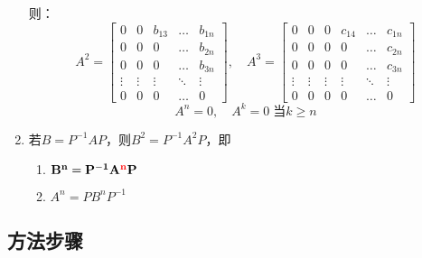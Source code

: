 \documentclass[a4paper,12pt]{article}
\begin{document}
\begin{enumerate}
        则：
        \[
            A^2 =
            \begin{bmatrix}
                0      & 0      & b_{13} & \dots  & b_{1n} \\
                0      & 0      & 0      & \dots  & b_{2n} \\
                0      & 0      & 0      & \dots  & b_{3n} \\
                \vdots & \vdots & \vdots & \ddots & \vdots \\
                0      & 0      & 0      & \dots  & 0
            \end{bmatrix}, \quad
            A^3 =
            \begin{bmatrix}
                0      & 0      & 0      & c_{14} & \dots  & c_{1n} \\
                0      & 0      & 0      & 0      & \dots  & c_{2n} \\
                0      & 0      & 0      & 0      & \dots  & c_{3n} \\
                \vdots & \vdots & \vdots & \vdots & \ddots & \vdots \\
                0      & 0      & 0      & 0      & \dots  & 0
            \end{bmatrix}
        \]
        \[
            A^n = 0, \quad A^k = 0 \; \text{当} k \ge n
        \]
        \item 若$B = P^{-1}AP$，则$B^2 = P^{-1}A^{2}P$，即
        \begin{enumerate}
            \item $\mathbf{B^n = P^{-1}A^{\color{red}{n}}P}$
            \item $A^n = PB^{n}P^{-1}$
        \end{enumerate}
    \end{enumerate}

    \subsection{方法步骤}
\end{document}
